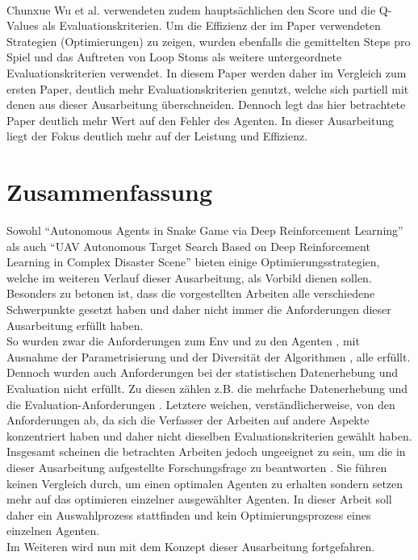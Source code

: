 \\Chunxue Wu et al. verwendeten zudem hauptsächlichen den Score und die Q-Values als Evaluationskriterien. Um die Effizienz der im Paper verwendeten Strategien (Optimierungen) zu zeigen, wurden ebenfalls die gemittelten Steps pro Spiel und das Auftreten von Loop Stoms als weitere untergeordnete Evaluationskriterien verwendet. In diesem Paper werden daher im Vergleich zum ersten Paper, deutlich mehr Evaluationskriterien genutzt, welche sich partiell mit denen aus dieser Ausarbeitung überschneiden. Dennoch legt das hier betrachtete Paper deutlich mehr Wert auf den Fehler des Agenten. In dieser Ausarbeitung liegt der Fokus deutlich mehr auf der Leistung und Effizienz.


\section{Zusammenfassung} \label{sec:Verwandte_Arbeiten_Zusammenfassung}
Sowohl "`Autonomous Agents in Snake Game via Deep Reinforcement Learning"'  als auch "`UAV Autonomous Target Search Based on Deep Reinforcement Learning in Complex Disaster Scene"'  bieten einige Optimierungsstrategien, welche im weiteren Verlauf dieser Ausarbeitung, als Vorbild dienen sollen.\\
Besonders zu betonen ist, dass die vorgestellten Arbeiten alle verschiedene Schwerpunkte gesetzt haben und daher nicht immer die Anforderungen dieser Ausarbeitung erfüllt haben.\\ 
So wurden zwar die Anforderungen zum Env  und zu den Agenten , mit Ausnahme der Parametrisierung  und der Diversität der Algorithmen , alle erfüllt. Dennoch wurden auch Anforderungen bei der statistischen Datenerhebung und Evaluation nicht erfüllt. Zu diesen zählen z.B. die mehrfache Datenerhebung  und die Evaluation-Anforderungen . Letztere weichen, verständlicherweise, von den Anforderungen ab, da sich die Verfasser der Arbeiten auf andere Aspekte konzentriert haben und daher nicht dieselben Evaluationskriterien gewählt haben.\\
Insgesamt scheinen die betrachten Arbeiten jedoch ungeeignet zu sein, um die in dieser Ausarbeitung aufgestellte Forschungsfrage zu beantworten . Sie führen keinen Vergleich durch, um einen optimalen Agenten zu erhalten sondern setzen mehr auf das optimieren einzelner ausgewählter Agenten. In dieser Arbeit soll daher ein Auswahlprozess stattfinden und kein Optimierungsprozess eines einzelnen Agenten.\\
Im Weiteren wird nun mit dem Konzept dieser Ausarbeitung fortgefahren.